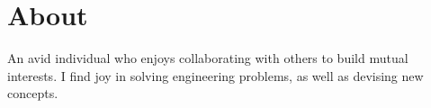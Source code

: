 \documentclass[9pt]{extarticle}
\begin{document}
%
	\begin{minipage}[t]{0.62\textwidth}
		
	\end{minipage}
%
	\hfill
%
	\begin{minipage}[t]{0.34\textwidth}
		\section*{About}
		An avid individual who enjoys collaborating with others to build mutual interests. I find
		joy in solving engineering problems, as well as devising new concepts.
		\vspace{4.8mm}

		
		
	\end{minipage}
\end{document}
